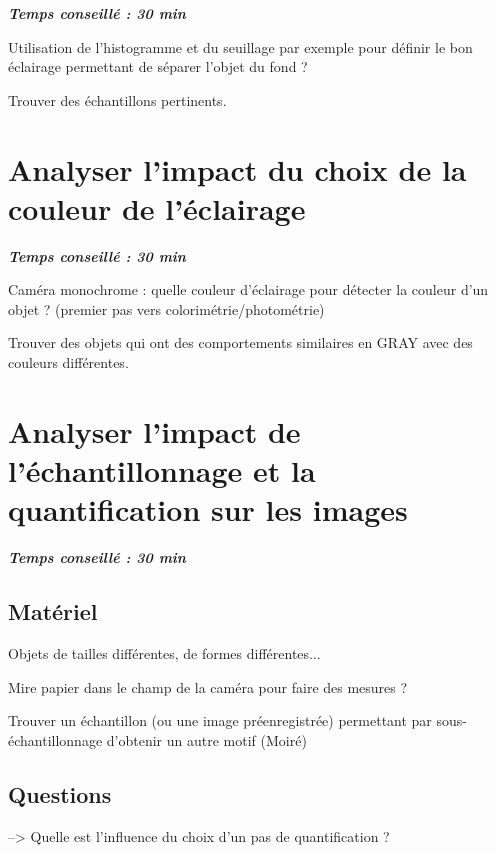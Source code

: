 \documentclass[a4paper,11pt,titlepage]{article} %
\begin{document}
\begin{center} \textbf{\textit{Temps conseillé : 30 min}} \end{center}

Utilisation de l'histogramme et du seuillage par exemple pour définir le bon éclairage permettant de séparer l'objet du fond ?

Trouver des échantillons pertinents.


\section{Analyser l'impact du choix de la couleur de l'éclairage}

\begin{center} \textbf{\textit{Temps conseillé : 30 min}} \end{center}


Caméra monochrome : quelle couleur d'éclairage pour détecter la couleur d'un objet ? (premier pas vers colorimétrie/photométrie)

Trouver des objets qui ont des comportements similaires en GRAY avec des couleurs différentes.


\section{Analyser l'impact de l'échantillonnage et la quantification sur les images}

\begin{center} \textbf{\textit{Temps conseillé : 30 min}} \end{center}


\subsection{Matériel}

Objets de tailles différentes, de formes différentes...

Mire papier dans le champ de la caméra pour faire des mesures ?

Trouver un échantillon (ou une image préenregistrée) permettant par sous-échantillonnage d'obtenir un autre motif (Moiré)

\subsection{Questions }

--> Quelle est l'influence du choix d'un pas de quantification ?
\end{document}

